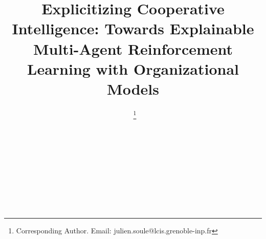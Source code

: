 \documentclass{ecai}
\begin{document}

\begin{frontmatter}




    \title{Explicitizing Cooperative Intelligence: Towards Explainable Multi-Agent Reinforcement Learning with Organizational Models}



    \author[A,B]{~\thanks{Corresponding Author. Email: julien.soule@lcis.grenoble-inp.fr}}
    \author[A]{~}
    \author[A]{~}
    \author[B]{~}
    \author[C]{~}

    \address[A]{Univ. Grenoble Alpes, Grenoble INP, LCIS, 26000, Valence, France}
    \address[B]{Thales Land and Air Systems, BL IAS, Rennes, France}
    \address[C]{AICA IWG, La Guillermie, France}



\end{frontmatter}
\end{document}
